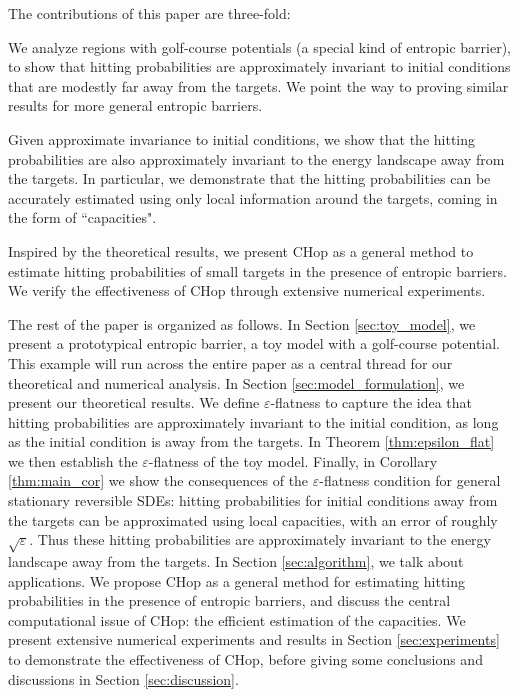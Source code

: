 \documentclass[english, aip, jcp, priprint, graphicx,floatfix]{revtex4-1}
\theoremstyle{plain}
\theoremstyle{definition}
\theoremstyle{plain}
\begin{document}
The contributions of this paper are three-fold:

\begin{description}[noitemsep]
	\item[Theory of golf-course potentials] We analyze regions with golf-course potentials (a special kind of entropic barrier), to show that hitting probabilities are approximately invariant to initial conditions that are modestly far away from the targets. We point the way to proving similar results for more general entropic barriers.
	\item[Theory of invariant hitting probabilities] Given approximate invariance to initial conditions, we show that the hitting probabilities are also approximately invariant to the energy landscape away from the targets. In particular, we demonstrate that the hitting probabilities can be accurately estimated using only local information around the targets, coming in the form of ``capacities".
	\item[Application] Inspired by the theoretical results, we present CHop as a general method to estimate hitting probabilities of small targets in the presence of entropic barriers. We verify the effectiveness of CHop through extensive numerical experiments.
\end{description}

The rest of the paper is organized as follows. In Section \ref{sec:toy_model}, we present a prototypical entropic barrier, a toy model with a golf-course potential.  This example will run across the entire paper as a central thread for our theoretical and numerical analysis. In Section \ref{sec:model_formulation}, we present our theoretical results. We define $\varepsilon$-flatness to capture the idea that hitting probabilities are approximately invariant to the initial condition, as long as the initial condition is away from the targets.  In Theorem \ref{thm:epsilon_flat} we then establish the $\varepsilon$-flatness of the toy model. Finally, in Corollary \ref{thm:main_cor} we show the consequences of the $\varepsilon$-flatness condition for general stationary reversible SDEs: hitting probabilities for initial conditions away from the targets can be approximated using local capacities, with an error of roughly $\sqrt\varepsilon$.  Thus these hitting probabilities are approximately invariant to the energy landscape away from the targets.  In Section \ref{sec:algorithm}, we talk about applications. We propose CHop as a general method for estimating hitting probabilities in the presence of entropic barriers, and discuss the central computational issue of CHop: the efficient estimation of the capacities. We present extensive numerical experiments and results in Section \ref{sec:experiments} to demonstrate the effectiveness of CHop, before giving some conclusions and discussions in Section \ref{sec:discussion}.
\end{document}
